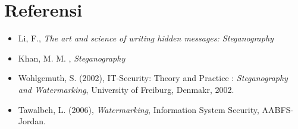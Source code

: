 \documentclass{article}
\begin{document}

\section*{Referensi}

\begin{itemize}
    \item Li, F., \textit{The art and science of writing hidden messages: Steganography}
    \item Khan, M. M. , \textit{Steganography}
    \item Wohlgemuth, S. (2002), IT-Security: Theory and Practice : \textit{Steganography and Watermarking}, University of Freiburg, Denmakr, 2002.
    \item Tawalbeh, L. (2006), \textit{Watermarking}, Information System Security, AABFS-Jordan.
\end{itemize}
\end{document}
